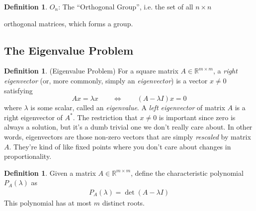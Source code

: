 \documentclass[12pt]{article}
\numberwithin{equation}{section} %
\theoremstyle{plain}
\theoremstyle{definition}
\newtheorem{defn}[thm]{Definition}
\theoremstyle{remark}
\newcommand{\Rmm}{\mathbb{R}^{m\times m}}
\begin{document}
\begin{defn}
$O_n$: The ``Orthogonal Group'', i.e. the set of all $n\times n$

orthogonal matrices, which forms a group.
\end{defn}



\clearpage
\subsection{The Eigenvalue Problem}


\begin{defn}{(Eigenvalue Problem)}
For a square matrix $A \in \Rmm$, a \emph{right eigenvector}
(or, more commonly, simply an \emph{eigenvector}) is a vector $x\neq 0$
satisfying
\begin{equation}
  Ax = \lambda x
  \qquad \Leftrightarrow \qquad
  (A-\lambda I) x = 0
\end{equation}
where $\lambda$ is some scalar, called an \emph{eigenvalue}.  A
\emph{left eigenvector} of matrix $A$ is a right eigenvector of $A^*$.
The restriction that $x\neq 0$ is important since zero is always a
solution, but it's a dumb trivial one we don't really care about.  In
other words, eigenvectors are those non-zero vectors that are simply
\emph{rescaled} by matrix $A$. They're kind of like fixed points where
you don't care about changes in proportionality.
\end{defn}

\begin{defn}
Given a matrix $A\in \Rmm$, define the characteristic
polynomial $P_A(\lambda)$ as
\begin{align}
  \label{chareqn}
  P_A(\lambda) = \det(A-\lambda I)
\end{align}
This polynomial has at most $m$ distinct roots.
\end{defn}
\end{document}
